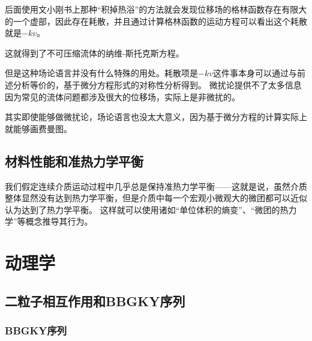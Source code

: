 后面使用文小刚书上那种“积掉热浴”的方法就会发现位移场的格林函数存在有限大的一个虚部，因此存在耗散，并且通过计算格林函数的运动方程可以看出这个耗散就是$-k v$。

这就得到了不可压缩流体的纳维-斯托克斯方程。

但是这种场论语言并没有什么特殊的用处。耗散项是$-kv$这件事本身可以通过与前述分析等价的，基于微分方程形式的对称性分析得到。
微扰论提供不了太多信息因为常见的流体问题都涉及很大的位移场，实际上是非微扰的。

其实即使能够做微扰论，场论语言也没太大意义，因为基于微分方程的计算实际上就能够画费曼图。

\section{材料性能和准热力学平衡}

我们假定连续介质运动过程中几乎总是保持准热力学平衡——这就是说，虽然介质整体显然没有达到热力学平衡，但是介质中每一个宏观小微观大的微团都可以近似认为达到了热力学平衡。
这样就可以使用诸如“单位体积的熵变”、“微团的热力学”等概念推导其行为。

\chapter{动理学}

\section{二粒子相互作用和BBGKY序列}

\subsection{BBGKY序列}\label{sec:bbgky}

